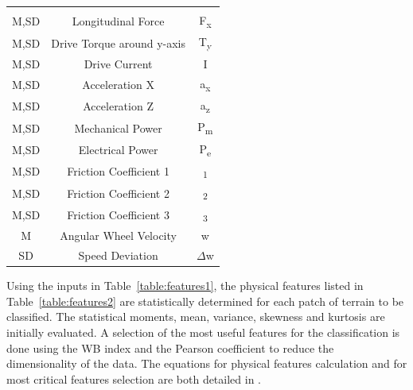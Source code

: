 \begin{center}
\label{table:features2}
\begin{supertabular}{ccc}
     \quad  & \quad                        & \quad \\[-5pt]
     M,SD	&  Longitudinal Force	       & F\textsubscript{x} \\ 
     M,SD	&  Drive Torque	around y-axis  & T\textsubscript{y} \\ 
     M,SD	&  Drive Current	           & I \\  
     M,SD	&  Acceleration X	           &  a\textsubscript{x}\\ 
     M,SD	&  Acceleration Z	           & a\textsubscript{z} \\ 
     M,SD	&  Mechanical Power	           & P\textsubscript{m} \\ 
     M,SD	&  Electrical Power	           & P\textsubscript{e} \\ 
     M,SD	&  Friction Coefficient 1	   & \textmu \textsubscript{1} \\ 
     M,SD	&  Friction Coefficient 2      & \textmu \textsubscript{2}\\ 
     M,SD	&  Friction Coefficient 3	   & \textmu \textsubscript{3}\\ 
     M	    &  Angular Wheel Velocity	   &  w      \\ 
     SD    	&  Speed Deviation	           & $\Delta$w\\ 
\end{supertabular}	
\end{center}

Using the inputs in Table~\ref{table:features1}, the physical features listed in Table~\ref{table:features2} are statistically determined for each patch of terrain to be classified.
The statistical moments, mean, variance, skewness and kurtosis are initially evaluated. 
A selection of the most useful features for the classification is done using the WB index and the Pearson coefficient to reduce the dimensionality of the data. The equations for physical features calculation and for most critical features selection are both detailed in \citep{Dimastrogiovanni2020}.

